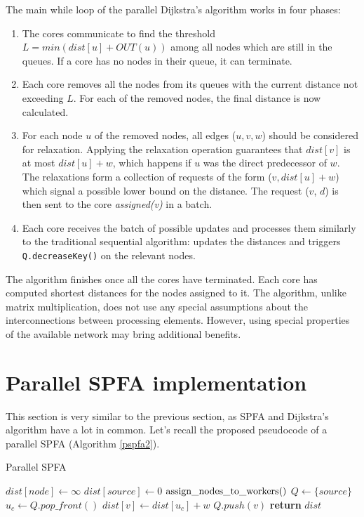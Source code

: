 \documentclass[12pt,a4paper,oneside,openright]{report}
\begin{document}
The main while loop of the parallel Dijkstra's algorithm works in four phases:\vspace{-5pt}
\begin{enumerate}
    \item The cores communicate to find the threshold $L = min(dist[u] + OUT(u))$ among all nodes which are still in the queues. If a core has no nodes in their queue, it can terminate.
    \item Each core removes all the nodes from its queues with the current distance not exceeding $L$. For each of the removed nodes, the final distance is now calculated.
    \item For each node $u$ of the removed nodes, all edges ($u, v, w$) should be considered for relaxation. Applying the relaxation operation guarantees that $dist[v]$ is at most $dist[u] + w$, which happens if $u$ was the direct predecessor of $w$. The relaxations form a collection of requests of the form ($v, dist[u]+w$) which signal a possible lower bound on the distance. The request ($v$, $d$) is then sent to the core \textit{assigned(v)} in a batch.
    \item Each core receives the batch of possible updates and processes them similarly to the traditional sequential algorithm: updates the distances and triggers \texttt{Q.decreaseKey()} on the relevant nodes.
\end{enumerate}

The algorithm finishes once all the cores have terminated. Each core has computed shortest distances for the nodes assigned to it. The algorithm, unlike matrix multiplication, does not use any special assumptions about the interconnections between processing elements. However, using special properties of the available network may bring additional benefits.

\section{Parallel SPFA implementation}
This section is very similar to the previous section, as SPFA and Dijkstra's algorithm have a lot in common. Let's recall the proposed pseudocode of a parallel SPFA (Algorithm \ref{pspfa2}).

\begin{algorithm}
\caption{Parallel SPFA}\label{pspfa2}
\begin{algorithmic}[1]
    \State $dist[node] \gets \infty$
\EndFor
\State $dist[source] \gets 0$
\State $\rm{assign\_nodes\_to\_workers()}$
\State $Q \gets \{source\}$ 
        \State $u_c \gets Q.pop\_front()$
            \State $dist[v] \gets dist[u_c] + w$
                \State $Q.push(v)$
                \EndIf
        \EndIf
        \EndFor
      \EndFor
    \EndWhile
\State \textbf{return} $dist$
\EndProcedure
\end{algorithmic}
\end{algorithm}
\end{document}
